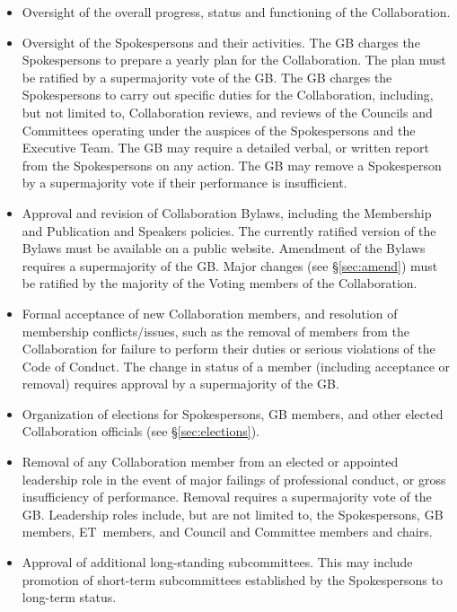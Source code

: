 \documentclass[12pt]{article}
\newcommand{\exec}{{Executive Team}}
\newcommand{\shorte}{{ET}}  %
\begin{document}
\begin{itemize}
\item Oversight of the overall progress, status and functioning of the Collaboration.  

\item Oversight of the Spokespersons and their activities.  The GB charges the Spokespersons to prepare a yearly plan for the Collaboration.  The plan must be ratified by a supermajority vote of the GB.  The GB charges the Spokespersons to carry out specific duties for the Collaboration, including, but not limited to, Collaboration reviews, and reviews of the Councils and Committees operating under the auspices of the Spokespersons and the \exec.  The GB may require a detailed verbal, or written report from the Spokespersons on any action. The GB may remove a Spokesperson by a supermajority vote if their performance is insufficient.

\item Approval and revision of Collaboration Bylaws, including the Membership and Publication and Speakers policies. The currently ratified version of the Bylaws must be available on a public website. Amendment of the Bylaws requires a supermajority of the GB.  Major changes (see \S\ref{sec:amend}) must be ratified by the majority of the Voting members of the Collaboration.

\item Formal acceptance of new Collaboration members, and resolution of membership conflicts/issues, such as the removal of members from the Collaboration for failure to perform their duties or serious violations of the Code of Conduct. The change in status of a member (including acceptance or removal) requires approval by a supermajority of the GB.

\item Organization of elections for Spokespersons, GB members, and other elected Collaboration officials (see \S\ref{sec:elections}).  

\item Removal of any Collaboration member from an elected or appointed leadership role in the event of major failings of professional conduct, or gross insufficiency of performance.  Removal requires a supermajority vote of the GB.   Leadership roles include, but are not limited to, the Spokespersons, GB members, \shorte\ members, and Council and Committee members and chairs.

\item Approval of additional long-standing subcommittees. This may include promotion of short-term subcommittees established by the Spokespersons to long-term status. 

\end{itemize}
\end{document}
